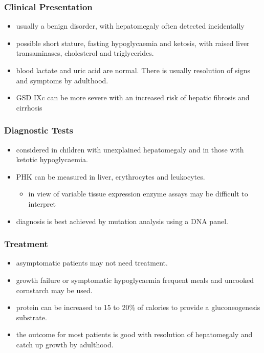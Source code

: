 \documentclass{scrartcl}
\begin{document}
\subsubsection{Clinical Presentation}
\label{sec:org2275438}
\begin{itemize}
\item usually a benign disorder, with hepatomegaly often detected
incidentally
\item possible short stature, fasting hypoglycaemia and ketosis, with
raised liver transaminases, cholesterol and triglycerides.
\item blood lactate and uric acid are normal. There is usually resolution
of signs and symptoms by adulthood.
\item GSD IXc can be more severe with an increased risk of hepatic fibrosis and cirrhosis
\end{itemize}

\subsubsection{Diagnostic Tests}
\label{sec:orgf50a03a}
\begin{itemize}
\item considered in children with unexplained hepatomegaly and in those with ketotic hypoglycaemia.
\item PHK can be measured in liver, erythrocytes and leukocytes.
\begin{itemize}
\item in view of variable tissue expression enzyme assays may be
difficult to interpret
\end{itemize}
\item diagnosis is best achieved by mutation analysis using a DNA panel.
\end{itemize}
\subsubsection{Treatment}
\label{sec:org5e02c5c}
\begin{itemize}
\item asymptomatic patients may not need treatment.
\item growth failure or symptomatic hypoglycaemia frequent meals and
uncooked cornstarch may be used.
\item protein can be increased to 15 to 20\% of calories to provide a
gluconeogenesis substrate.
\item the outcome for most patients is good with resolution of
hepatomegaly and catch up growth by adulthood.
\end{itemize}
\end{document}
